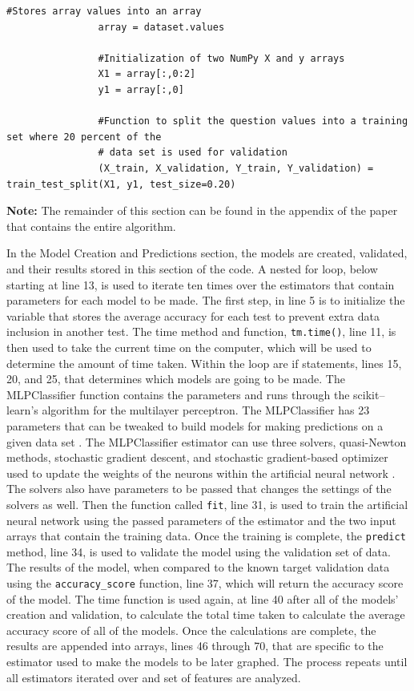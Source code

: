 \documentclass[a4paper, 12pt]{article}
\begin{document}
\begin{paragraph}
\begin{lstlisting}[frame = single]
                #Stores array values into an array
                array = dataset.values

                #Initialization of two NumPy X and y arrays
                X1 = array[:,0:2]
                y1 = array[:,0]

                #Function to split the question values into a training set where 20 percent of the 
                # data set is used for validation
                (X_train, X_validation, Y_train, Y_validation) = train_test_split(X1, y1, test_size=0.20)

\end{lstlisting}
\textbf{Note:} The remainder of this section can be found in the appendix of the paper that contains the entire algorithm.
\newline

\par
\indent In the Model Creation and Predictions section, the models are created, validated, and their results stored in this section of the code. A nested for loop, below starting at line 13, is used to iterate ten times over the estimators that contain parameters for each model to be made. The first step, in line 5 is to initialize the variable that stores the average accuracy for each test to prevent extra data inclusion in another test. The time method and function, \texttt{tm.time()}, line 11, is then used to take the current time on the computer, which will be used to determine the amount of time taken. Within the loop are if statements, lines 15, 20, and 25, that determines which models are going to be made. The MLPClassifier function contains the parameters and runs through the scikit--learn's algorithm for the multilayer perceptron. The MLPClassifier has 23 parameters that can be tweaked to build models for making predictions on a given data set \cite{SciKit}. The MLPClassifier estimator can use three solvers, quasi-Newton methods, stochastic gradient descent, and stochastic gradient-based optimizer used to update the weights of the neurons within the artificial neural network \cite{SciKit}. The solvers also have parameters to be passed that changes the settings of the solvers as well. Then the function called \texttt{fit}, line 31, is used to train the artificial neural network using the passed parameters of the estimator and the two input arrays that contain the training data. Once the training is complete, the \texttt{predict} method, line 34, is used to validate the model using the validation set of data. The results of the model, when compared to the known target validation data using the \texttt{accuracy\_score} function, line 37, which will return the accuracy score of the model. The time function is used again, at line 40 after all of the models' creation and validation, to calculate the total time taken to calculate the average accuracy score of all of the models. Once the calculations are complete, the results are appended into arrays, lines 46 through 70, that are specific to the estimator used to make the models to be later graphed. The process repeats until all estimators iterated over and set of features are analyzed.

\end{paragraph}
\end{document}
